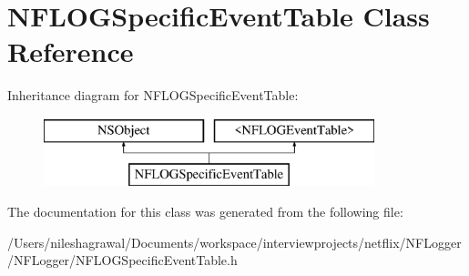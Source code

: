 \hypertarget{interface_n_f_l_o_g_specific_event_table}{}\section{N\+F\+L\+O\+G\+Specific\+Event\+Table Class Reference}
\label{interface_n_f_l_o_g_specific_event_table}
Inheritance diagram for N\+F\+L\+O\+G\+Specific\+Event\+Table\+:\begin{figure}[H]
\begin{center}
\leavevmode
\includegraphics[height=2.000000cm]{interface_n_f_l_o_g_specific_event_table}
\end{center}
\end{figure}


The documentation for this class was generated from the following file\+:\begin{DoxyCompactItemize}
\item 
/\+Users/nileshagrawal/\+Documents/workspace/interviewprojects/netflix/\+N\+F\+Logger/\+N\+F\+Logger/N\+F\+L\+O\+G\+Specific\+Event\+Table.\+h\end{DoxyCompactItemize}
